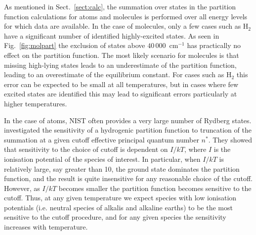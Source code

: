 \documentclass[traditabstract]{aa} %
\begin{document}
As mentioned in Sect.~\ref{sect:calc}, the summation over states in the partition function calculations for atoms and molecules is performed over all energy levels for which data are available.  In the case of molecules, only a few cases such as H$_2$ have a significant number of identified highly-excited states.  As seen in Fig.~\ref{fig:molpart} the exclusion of states above $40\,000$~cm$^{-1}$ has practically no effect on the partition function.  The most likely scenario for molecules is that missing high-lying states leads to an underestimate of the partition function, leading to an overestimate of the equilibrium constant.  For cases such as H$_2$ this error can be expected to be small at all temperatures, but in cases where few excited states are identified this may lead to significant errors particularly at higher temperatures.   

In the case of atoms, NIST often provides a very large number of Rydberg states.  \cite{hummer_equation_1988a} investigated the sensitivity of a hydrogenic partition function to truncation of the summation at a given cutoff effective principal quantum number $n^*$.  They showed that sensitivity to the choice of cutoff is dependent on $I/kT$, where $I$ is the ionisation potential of the species of interest.  In particular, when $I/kT$ is relatively large, say greater than 10, the ground state dominates the partition function, and the result is quite insensitive for any reasonable choice of the cutoff.  However, as $I/kT$ becomes smaller the partition function becomes sensitive to the cutoff.  Thus, at any given temperature we expect species with low ionisation potentials (i.e. neutral species of alkalis and alkaline earths) to be the most sensitive to the cutoff procedure, and for any given species the sensitivity increases with temperature.  
\end{document}
